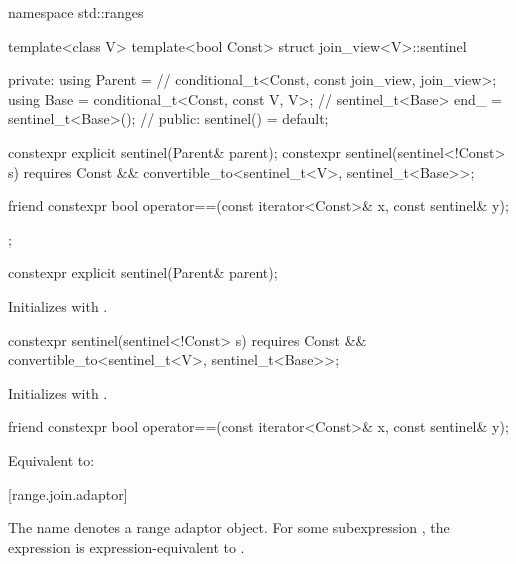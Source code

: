 %
\begin{codeblock}
namespace std::ranges {
  template<class V>
  template<bool Const>
  struct join_view<V>::sentinel {
  private:
    using Parent =                                      // \expos
      conditional_t<Const, const join_view, join_view>;
    using Base   = conditional_t<Const, const V, V>;    // \expos
    sentinel_t<Base> end_ = sentinel_t<Base>();         // \expos
  public:
    sentinel() = default;

    constexpr explicit sentinel(Parent& parent);
    constexpr sentinel(sentinel<!Const> s)
      requires Const && convertible_to<sentinel_t<V>, sentinel_t<Base>>;

    friend constexpr bool operator==(const iterator<Const>& x, const sentinel& y);
  };
}
\end{codeblock}

%
\begin{itemdecl}
constexpr explicit sentinel(Parent& parent);
\end{itemdecl}

\begin{itemdescr}
\pnum
\effects
Initializes  with .
\end{itemdescr}

%
\begin{itemdecl}
constexpr sentinel(sentinel<!Const> s)
  requires Const && convertible_to<sentinel_t<V>, sentinel_t<Base>>;
\end{itemdecl}

\begin{itemdescr}
\pnum
\effects
Initializes  with .
\end{itemdescr}

%
\begin{itemdecl}
friend constexpr bool operator==(const iterator<Const>& x, const sentinel& y);
\end{itemdecl}

\begin{itemdescr}
\pnum
\effects
Equivalent to: 
\end{itemdescr}

[range.join.adaptor]{}

\pnum
The name  denotes a
range adaptor object.
For some subexpression , the expression
 is expression-equivalent to
.


